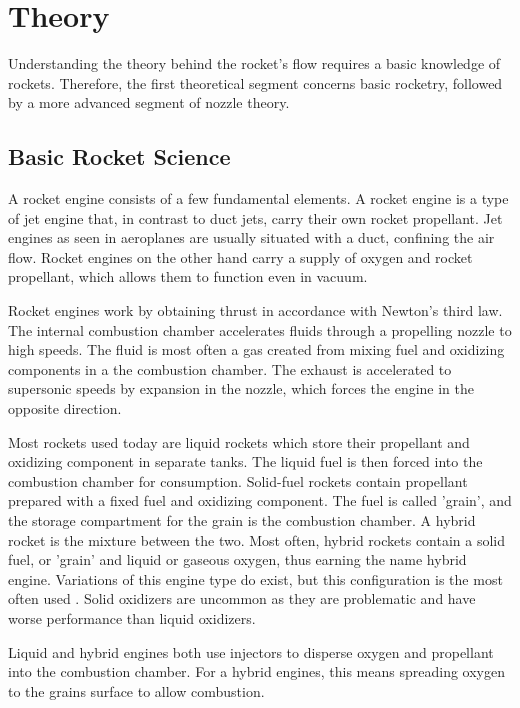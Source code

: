 \chapter{Theory}

	Understanding the theory behind the rocket's flow requires a basic knowledge of rockets. Therefore, the first theoretical segment concerns basic rocketry, followed by a more advanced segment of nozzle theory.

\section{Basic Rocket Science}

	A rocket engine consists of a few fundamental elements. A rocket engine is a type of jet engine that, in contrast to duct jets, carry their own rocket propellant. Jet engines as seen in aeroplanes are usually situated with a duct, confining the air flow. Rocket engines on the other hand carry a supply of oxygen and rocket propellant, which allows them to function even in vacuum.

	Rocket engines work by obtaining thrust in accordance with Newton's third law. The internal combustion chamber accelerates fluids through a propelling nozzle to high speeds. The fluid is most often a gas created from mixing fuel and oxidizing components in a the combustion chamber. The exhaust is accelerated to supersonic speeds by expansion in the nozzle, which forces the engine in the opposite direction.

	Most rockets used today are liquid rockets which store their propellant and oxidizing component in separate tanks. The liquid fuel is then forced into the combustion chamber for consumption. Solid-fuel rockets contain propellant prepared with a fixed fuel and oxidizing component. The fuel is called 'grain', and the storage compartment for the grain is the combustion chamber. A hybrid rocket is the mixture between the two. Most often, hybrid rockets contain a solid fuel, or 'grain' and liquid or gaseous oxygen, thus earning the name hybrid engine. Variations of this engine type do exist, but this configuration is the most often used \cite[chapter 16, p.~605]{rockProp}. Solid oxidizers are uncommon as they are problematic and have worse performance than liquid oxidizers.

	Liquid and hybrid engines both use injectors to disperse oxygen and propellant into the combustion chamber. For a hybrid engines, this means spreading oxygen to the grains surface to allow combustion.

